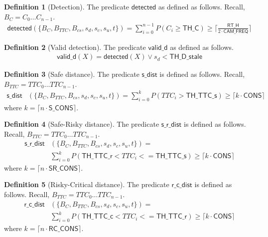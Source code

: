 \documentclass[12pt]{article}
\theoremstyle{definition}
\newtheorem{definition}{Definition}[section]
\begin{document}
\begin{definition}[Detection]
    The predicate $\mathsf{detected}$ as defined as follows. Recall, $B_C = C_0 \ldots C_{n-1}$.
    \[
        \begin{aligned}
                \mathsf{detected}(\{B_C, B_{TTC}, B_{cs}, s_d, s_c, s_u, t\}) = \sum_{i=0}^{n-1} P(C_i \geq \mathsf{TH\_C}) \geq \lceil \frac{\mathsf{RT\_H}}{ 2 \cdot \mathsf{CAM\_FREQ}} \rceil
        \end{aligned}
    \]
\end{definition}

\begin{definition}[Valid detection]
    The predicate $\mathsf{valid\_d}$ as defined as follows.
    \[
        \begin{aligned}
                \mathsf{valid\_d}(X) = \mathsf{detected}(X) \lor s_d < \mathsf{TH\_D\_stale}
        \end{aligned}
    \]
\end{definition}

\begin{definition}[Safe distance]
The predicate $\mathsf{s\_dist}$ is defined as follows. Recall, $B_{TTC} = TTC_0 \ldots TTC_{n-1}$.
\[
    \begin{aligned}
            \mathsf{s\_dist}&(\{B_C, B_{TTC}, B_{cs}, s_d, s_c, s_u, t\}) = \sum_{i=0}^{k} P(TTC_i > \mathsf{TH\_TTC\_s}) \geq \lceil k \cdot \mathsf{ CONS}\rceil
    \end{aligned}
\]
where $k = \lceil n \cdot \mathsf{S\_CONS} \rceil$.
    
\end{definition}

\begin{definition}[Safe-Risky distance]
The predicate $\mathsf{s\_r\_dist}$ is defined as follows. Recall, $B_{TTC} = TTC_0 \ldots TTC_{n-1}$.
\[
    \begin{aligned}
        \mathsf{s\_r\_dist}&(\{B_C, B_{TTC}, B_{cs}, s_d, s_c, s_u, t\}) = \\
        &\sum_{i=0}^{k} P(\mathsf{TH\_TTC\_r} < TTC_i <= \mathsf{TH\_TTC\_s}) \geq \lceil k \cdot \mathsf{CONS}\rceil
    \end{aligned}
\]
where $k = \lceil n \cdot \mathsf{SR\_CONS} \rceil$.
    
\end{definition}

\begin{definition}[Risky-Critical distance]
The predicate $\mathsf{r\_c\_dist}$ is defined as follows. Recall, $B_{TTC} = TTC_0 \ldots TTC_{n-1}$.
\[
    \begin{aligned}
        \mathsf{r\_c\_dist}&(\{B_C, B_{TTC}, B_{cs}, s_d, s_c, s_u, t\}) = \\ 
        &\sum_{i=0}^{k} P(\mathsf{TH\_TTC\_c} < TTC_i <= \mathsf{TH\_TTC\_r}) \geq \lceil k \cdot \mathsf{CONS}\rceil
    \end{aligned}
\]
where $k = \lceil n \cdot \mathsf{RC\_CONS} \rceil$.    
\end{definition}
\end{document}
